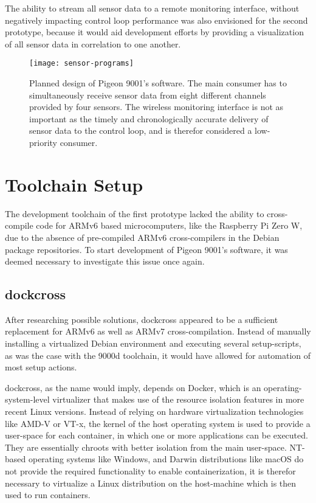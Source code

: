 The ability to stream all sensor data to a remote monitoring interface, without negatively impacting control loop performance was also envisioned for the second prototype, because it would aid development efforts by providing a visualization of all sensor data in correlation to one another.

\begin{figure}[H]
\centering

\texttt{[image: sensor-programs]}
\caption{Planned design of Pigeon 9001's software. The main consumer has to simultaneously receive sensor data from eight different channels provided by four sensors. The wireless monitoring interface is not as important as the timely and chronologically accurate delivery of sensor data to the control loop, and is therefor considered a low-priority consumer.}
\end{figure}

\newpage

\section{Toolchain Setup}
\author{Philip Trauner}

The development toolchain of the first prototype lacked the ability to cross-compile code for ARMv6 based microcomputers, like the Raspberry Pi Zero W, due to the absence of pre-compiled ARMv6 cross-compilers in the Debian package repositories. To start development of Pigeon 9001's software, it was deemed necessary to investigate this issue once again. 

\subsection{dockcross}
After researching possible solutions, dockcross\cite{dockcross} appeared to be a sufficient replacement for ARMv6 as well as ARMv7 cross-compilation. Instead of manually installing a virtualized Debian environment and executing several setup-scripts, as was the case with the 9000d toolchain, it would have allowed for automation of most setup actions.

dockcross, as the name would imply, depends on Docker, which is an operating-system-level virtualizer that makes use of the resource isolation features in more recent Linux versions. Instead of relying on hardware virtualization technologies like AMD-V or VT-x, the kernel of the host operating system is used to provide a user-space for each container, in which one or more applications can be executed. They are essentially chroots with better isolation from the main user-space.
NT-based operating systems like Windows, and Darwin distributions like macOS do not provide the required functionality to enable containerization, it is therefor necessary to virtualize a Linux distribution on the host-machine which is then used to run containers. 

